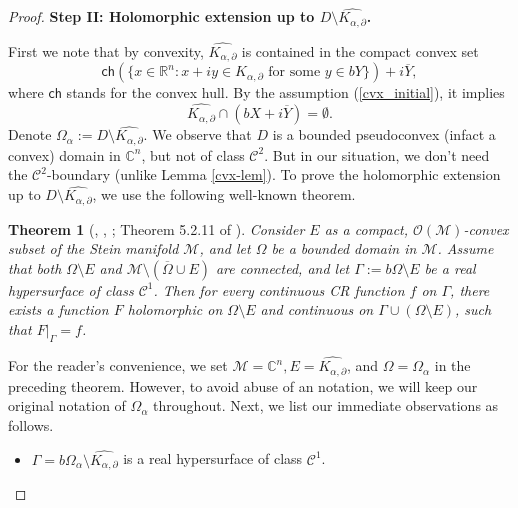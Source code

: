 \documentclass[12pt,reqno, a4paper]{amsart}
\newtheorem{theorem}{Theorem}[section]
\theoremstyle{definition}
\theoremstyle{definition}
\numberwithin{equation}{section}
\def\R{\mathbb{R}}                              %
\def\C{\mathbb{C}}                              %
\begin{document}
\begin{proof}
\noindent \textbf{Step II: Holomorphic extension up to $D\setminus \widehat{K_{\alpha,\partial}}$.}\\

 \vspace*{-.3cm} 

First we note that by convexity, $\widehat{K_{\alpha,\partial}}$ is contained in the compact convex set
\begin{equation}\label{ch_contained}
	\textsf{ch}(\{x\in \R^n: x+iy \in K_{\alpha,\partial} \text{ for some } y\in b{Y} \})+i\overline{Y},
\end{equation}
where $\textsf{ch}$ stands for the convex hull. By the assumption (\ref{cvx_initial}), it implies
\begin{equation}\label{eps_gurrenty}
	{\widehat{K_{\alpha,\partial}} \cap (b X+i\overline{Y}) =\emptyset.}
\end{equation} 
Denote $\Omega_{\alpha}:=D\setminus \widehat{K_{\alpha,\partial}}$. We observe that $D$ is a bounded 
pseudoconvex (infact a convex) domain in $\C^n$, but not of class $\mathcal{C}^2$. But in our situation, we don't need the $\mathcal{C}^2$-boundary (unlike Lemma \ref{cvx-lem}). To prove the holomorphic extension up to $D\setminus \widehat{K_{\alpha,\partial}}$, we use the following well-known theorem.

\begin{theorem}[\cite{st-81}, \cite{Lupa-86}, \cite{chir-st}; Theorem 5.2.11 of \cite{stout}]\label{key_theorem}
Consider $E$ as a compact, $\mathcal{O}(\mathcal{M})$-convex subset of the Stein manifold $\mathcal{M}$, and let $\Omega$ be a bounded domain in $\mathcal{M}$. Assume that both $\Omega\setminus E$ and $\mathcal{M}\setminus (\overline{\Omega}\cup E)$ are connected, and let $ \Gamma:= b\Omega \setminus E$ be a real hypersurface of class $\mathcal{C}^1$.
Then for every continuous CR function $f$ on $\Gamma$, there exists a function $F$ holomorphic on $\Omega \setminus E$ and continuous on $\Gamma \cup (\Omega \setminus E)$, such that $F|_{\Gamma}=f$.
\end{theorem}

For the reader's convenience, we set $\mathcal{M}=\C^n, E= \widehat{K_{\alpha,\partial}}$, and $\Omega=\Omega_{\alpha}$ in the preceding theorem. However, to avoid abuse of an notation, we will keep our original notation of $\Omega_{\alpha}$ throughout. Next, we list our immediate observations as follows.
\begin{itemize}	
\item[(i)] $ \Gamma= b\Omega_{\alpha} \setminus\widehat{K_{\alpha,\partial}}$ is a real hypersurface of class $\mathcal{C}^1$.
 

\end{itemize}
\end{proof}
\end{document}
